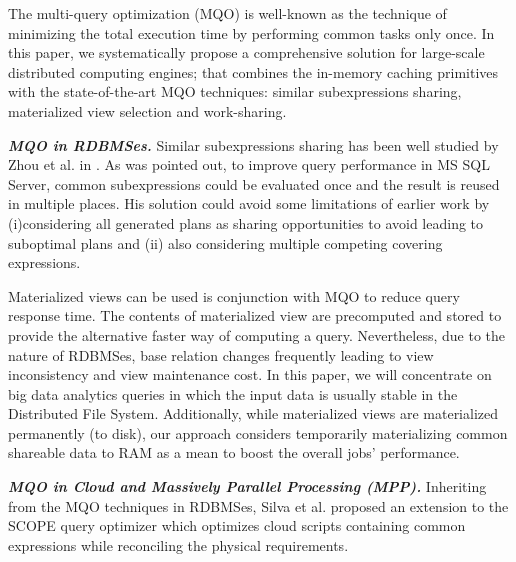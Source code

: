 The multi-query optimization (MQO) is well-known as the technique of minimizing the total execution time by performing common tasks only once. In this paper, we systematically propose a comprehensive solution for large-scale distributed computing engines; that combines the in-memory caching primitives with the state-of-the-art MQO techniques: similar subexpressions sharing, materialized view selection and work-sharing.

\emph{\textbf{MQO in RDBMSes.}} Similar subexpressions sharing has been well studied by Zhou et al. in \cite{zhou2007efficient}. As was pointed out, to improve query performance in MS SQL Server, common subexpressions could be evaluated once and the result is reused in multiple places. His solution could avoid some limitations of earlier work \cite{finkelstein1982common, roy2000efficient} by (i)considering all generated plans as sharing opportunities to avoid leading to suboptimal plans and (ii) also considering multiple competing covering expressions. 



Materialized views can be used is conjunction with MQO to reduce query response time. The contents of materialized view are precomputed and stored to provide the alternative faster way of computing a query. Nevertheless, due to the nature of RDBMSes, base relation changes frequently leading to view inconsistency and view maintenance cost. In this paper, we will concentrate on big data analytics queries in which the input data is usually stable in the Distributed File System. Additionally, while materialized views are materialized permanently (to disk), our approach considers temporarily materializing common shareable data to RAM as a mean to boost the overall jobs' performance.

\emph{\textbf{MQO in Cloud and Massively Parallel Processing (MPP).}} Inheriting from the MQO techniques in RDBMSes, Silva et al. \cite{silva2012exploiting} proposed an extension to the SCOPE query optimizer which optimizes cloud scripts containing common expressions while reconciling the physical requirements.

